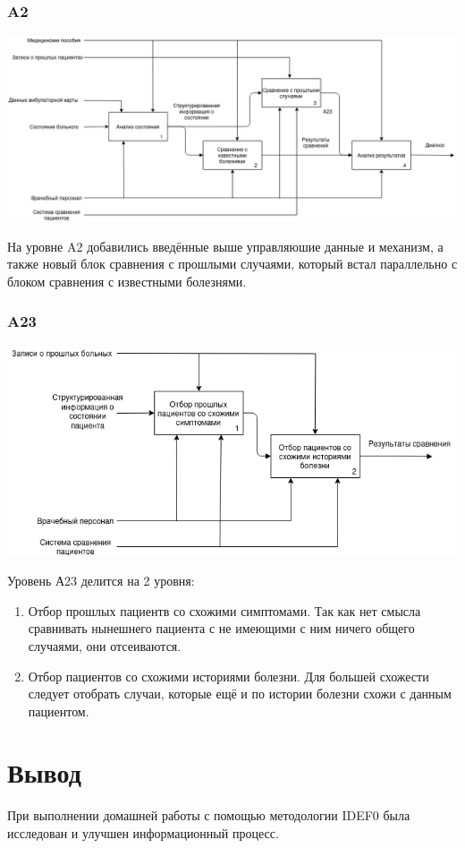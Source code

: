 \documentclass[a4paper, 12pt]{article}
\begin{document}
\subsubsection{A2}
\begin{center}
  \centering
  \includegraphics[width=.7\linewidth]{extra/to-be_A2.png}
  \label{fig:prplot}
\end{center}
На уровне A2 добавились введённые выше управляюшие данные и механизм, а также новый блок сравнения с прошлыми случаями, который встал параллельно с блоком сравнения с известными болезнями.
\subsubsection{A23}
\begin{center}
  \centering
  \includegraphics[width=.7\linewidth]{extra/to-be_A23.png}
  \label{fig:prplot}
\end{center}
Уровень А23 делится на 2 уровня:
\begin{enumerate}
  \item Отбор прошлых пациентв со схожими симптомами. Так как нет смысла сравнивать нынешнего пациента с не имеющими с ним ничего общего случаями, они отсеиваются.
  \item Отбор пациентов со схожими историями болезни. Для большей схожести следует отобрать случаи, которые ещё и по истории болезни схожи с данным пациентом.
\end{enumerate}
\newpage
\section{Вывод}
При выполнении домашней работы с помощью
методологии IDEF0 была исследован и улучшен информационный процесс.
\end{document}
